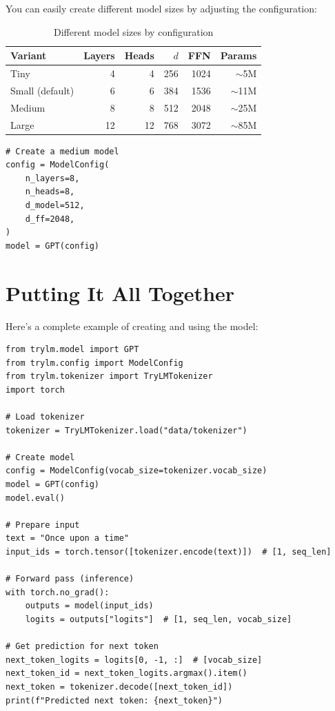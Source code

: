 You can easily create different model sizes by adjusting the configuration:

\begin{table}[H]
\centering
\begin{tabular}{lrrrrr}
\toprule
\textbf{Variant} & \textbf{Layers} & \textbf{Heads} & \textbf{$d$} & \textbf{FFN} & \textbf{Params} \\
\midrule
Tiny & 4 & 4 & 256 & 1024 & $\sim$5M \\
Small (default) & 6 & 6 & 384 & 1536 & $\sim$11M \\
Medium & 8 & 8 & 512 & 2048 & $\sim$25M \\
Large & 12 & 12 & 768 & 3072 & $\sim$85M \\
\bottomrule
\end{tabular}
\caption{Different model sizes by configuration}
\label{tab:model-variants}
\end{table}

\begin{lstlisting}[style=python]
# Create a medium model
config = ModelConfig(
    n_layers=8,
    n_heads=8,
    d_model=512,
    d_ff=2048,
)
model = GPT(config)
\end{lstlisting}

\section{Putting It All Together}

Here's a complete example of creating and using the model:

\begin{lstlisting}[style=python]
from trylm.model import GPT
from trylm.config import ModelConfig
from trylm.tokenizer import TryLMTokenizer
import torch

# Load tokenizer
tokenizer = TryLMTokenizer.load("data/tokenizer")

# Create model
config = ModelConfig(vocab_size=tokenizer.vocab_size)
model = GPT(config)
model.eval()

# Prepare input
text = "Once upon a time"
input_ids = torch.tensor([tokenizer.encode(text)])  # [1, seq_len]

# Forward pass (inference)
with torch.no_grad():
    outputs = model(input_ids)
    logits = outputs["logits"]  # [1, seq_len, vocab_size]

# Get prediction for next token
next_token_logits = logits[0, -1, :]  # [vocab_size]
next_token_id = next_token_logits.argmax().item()
next_token = tokenizer.decode([next_token_id])
print(f"Predicted next token: {next_token}")
\end{lstlisting}

